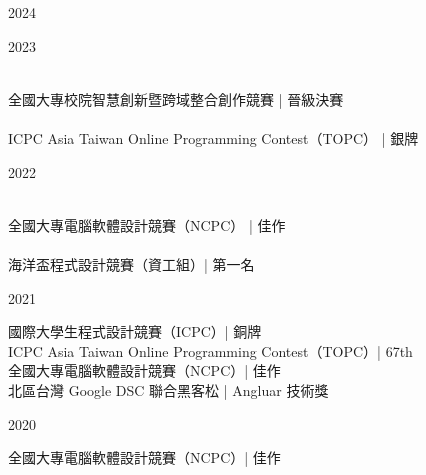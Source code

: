 
\noindent
\begin{minipage}[t]{0.055\textwidth}
  2024
\end{minipage}
\hfill\vline\hfill
\begin{minipage}[t]{0.9\textwidth}
\end{minipage}

\noindent
\begin{minipage}[t]{0.055\textwidth}
  2023
\end{minipage}
\hfill\vline\hfill
\begin{minipage}[t]{0.9\textwidth}
   \\
  全國大專校院智慧創新暨跨域整合創作競賽 | 晉級決賽 \\
   \\
  ICPC Asia Taiwan Online Programming Contest（TOPC） | 銀牌
\end{minipage}

\noindent
\begin{minipage}[t]{0.055\textwidth}
  2022
\end{minipage}
\hfill\vline\hfill
\begin{minipage}[t]{0.9\textwidth}
  \\
  全國大專電腦軟體設計競賽（NCPC） | 佳作\\
  \\
  海洋盃程式設計競賽（資工組）| 第一名
\end{minipage}

\noindent
\begin{minipage}[t]{0.055\textwidth}
  2021
\end{minipage}
\hfill\vline\hfill
\begin{minipage}[t]{0.9\textwidth}
  國際大學生程式設計競賽（ICPC）| 銅牌\\
  ICPC Asia Taiwan Online Programming Contest（TOPC）| 67th\\
  全國大專電腦軟體設計競賽（NCPC）| 佳作\\
  北區台灣 Google DSC 聯合黑客松 | Angluar 技術獎
\end{minipage}

\noindent
\begin{minipage}[t]{0.055\textwidth}
  2020
\end{minipage}
\hfill\vline\hfill
\begin{minipage}[t]{0.9\textwidth}
  全國大專電腦軟體設計競賽（NCPC）| 佳作
\end{minipage}

